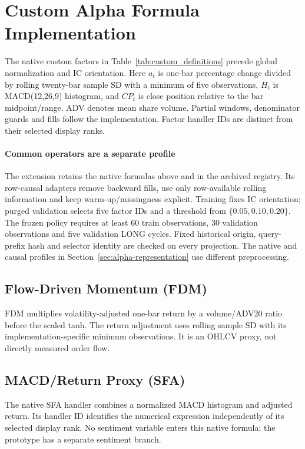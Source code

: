 \setcounter{table}{0}
\section{Custom Alpha Formula Implementation}
\label{app:signals}
The native custom factors in Table~\ref{tab:custom_definitions} precede global normalization and IC orientation. Here $a_t$ is one-bar percentage change divided by rolling twenty-bar sample SD with a minimum of five observations, $H_t$ is MACD(12,26,9) histogram, and $CP_t$ is close position relative to the bar midpoint/range. ADV denotes mean share volume. Partial windows, denominator guards and fills follow the implementation. Factor handler IDs are distinct from their selected display ranks.


\paragraph{Common operators are a separate profile}
The extension retains the native formulas above and in the archived registry. Its row-causal adapters remove backward fills, use only row-available rolling information and keep warm-up/missingness explicit. Training fixes IC orientation; purged validation selects five factor IDs and a threshold from $\{0.05,0.10,0.20\}$. The frozen policy requires at least 60 train observations, 30 validation observations and five validation LONG cycles. Fixed historical origin, query-prefix hash and selector identity are checked on every projection. The native and causal profiles in Section~\ref{sec:alpha-representation} use different preprocessing.

\subsection{Flow-Driven Momentum (FDM)}
FDM multiplies volatility-adjusted one-bar return by a volume/ADV20 ratio before the scaled tanh. The return adjustment uses rolling sample SD with its implementation-specific minimum observations. It is an OHLCV proxy, not directly measured order flow.

\subsection{MACD/Return Proxy (SFA)}
The native SFA handler combines a normalized MACD histogram and adjusted return. Its handler ID identifies the numerical expression independently of its selected display rank. No sentiment variable enters this native formula; the prototype has a separate sentiment branch.

